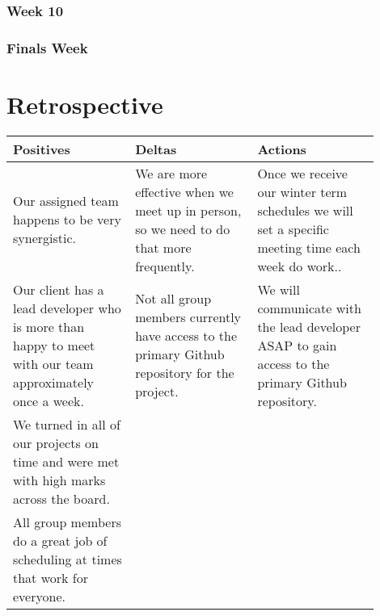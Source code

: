 \documentclass[onecolumn, draftclsnofoot,10pt, compsoc]{article}
\begin{document}
		\subsubsection{Week 10}
		
		\subsubsection{Finals Week}
		
\section{Retrospective}
\begin{center}
    \begin{tabular}{ |  p{0.3\linewidth} | p{0.3\linewidth} |  p{0.3\linewidth} |}
    \hline
    Positives & Deltas & Actions \\ \hline
    Our assigned team happens to be very synergistic. & We are more effective when we meet up in person, so we need to do that more frequently.
    & Once we receive our winter term schedules we will set a specific meeting time each week do work..  \\ \hline
    Our client has a lead developer who is more than happy to meet with our team approximately once a week. &
    Not all group members currently have access to the primary Github repository for the project. &
    We will communicate with the lead developer ASAP to gain access to the primary Github repository.  \\ \hline
    We turned in all of our projects on time and were met with high marks across the board. & & \\ \hline
    All group members do a great job of scheduling at times that work for everyone. &  & \\ \hline
    \end{tabular}
\end{center}
\end{document}
